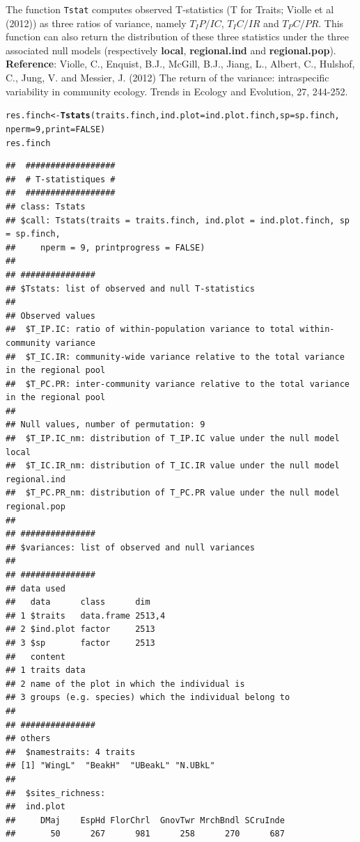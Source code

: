 \documentclass[12pt]{article}\usepackage[]{graphicx}\usepackage[]{color}
\makeatletter
\newcommand{\hlnum}[1]{\textcolor[rgb]{0.686,0.059,0.569}{#1}}%
\newcommand{\hlstd}[1]{\textcolor[rgb]{0.345,0.345,0.345}{#1}}%
\newcommand{\hlkwb}[1]{\textcolor[rgb]{0.69,0.353,0.396}{#1}}%
\newcommand{\hlkwc}[1]{\textcolor[rgb]{0.333,0.667,0.333}{#1}}%
\newcommand{\hlkwd}[1]{\textcolor[rgb]{0.737,0.353,0.396}{\textbf{#1}}}%
\newenvironment{kframe}{%
 \def\at@end@of@kframe{}%
 \ifinner\ifhmode%
  \def\at@end@of@kframe{\end{minipage}}%
  \begin{minipage}{\columnwidth}%
 \fi\fi%
 \def\FrameCommand##1{\hskip\@totalleftmargin \hskip-\fboxsep
 \colorbox{shadecolor}{##1}\hskip-\fboxsep
     \hskip-\linewidth \hskip-\@totalleftmargin \hskip\columnwidth}%
 \MakeFramed {\advance\hsize-\width
   \@totalleftmargin\z@ \linewidth\hsize
   \@setminipage}}%
 {\par\unskip\endMakeFramed%
 \at@end@of@kframe}
\newenvironment{knitrout}{}{} %
\makeatother
\begin{document}
The function \texttt{Tstat} computes observed T-statistics (T for Traits; Violle et al (2012)) as three ratios of variance, namely $T_IP/IC$, $T_IC/IR$ and $T_PC/PR$. This function can also return the distribution of these three statistics under the three associated null models (respectively \textbf{local}, \textbf{regional.ind} and \textbf{regional.pop}).
\\

\textbf{Reference}: Violle, C., Enquist, B.J., McGill, B.J., Jiang, L., Albert, C., Hulshof, C., Jung, V. and Messier, J. (2012) The return of the variance: intraspecific variability in community ecology. Trends in Ecology and Evolution, 27, 244-252.

\begin{knitrout}
\color{fgcolor}\begin{kframe}
\begin{alltt}
\hlstd{res.finch}\hlkwb{<-}\hlkwd{Tstats}\hlstd{(traits.finch,} \hlkwc{ind.plot} \hlstd{= ind.plot.finch,} \hlkwc{sp} \hlstd{= sp.finch,}
         \hlkwc{nperm} \hlstd{=} \hlnum{9}\hlstd{,} \hlkwc{print} \hlstd{=} \hlnum{FALSE}\hlstd{)}
\hlstd{res.finch}
\end{alltt}
\begin{verbatim}
## 	##################
## 	# T-statistiques #
## 	##################
## class: Tstats
## $call: Tstats(traits = traits.finch, ind.plot = ind.plot.finch, sp = sp.finch, 
##     nperm = 9, printprogress = FALSE)
## 
## ###############
## $Tstats: list of observed and null T-statistics
## 
## Observed values
## 	$T_IP.IC: ratio of within-population variance to total within-community variance
## 	$T_IC.IR: community-wide variance relative to the total variance in the regional pool
## 	$T_PC.PR: inter-community variance relative to the total variance in the regional pool
## 
## Null values, number of permutation: 9
## 	$T_IP.IC_nm: distribution of T_IP.IC value under the null model local
## 	$T_IC.IR_nm: distribution of T_IC.IR value under the null model regional.ind 
## 	$T_PC.PR_nm: distribution of T_PC.PR value under the null model regional.pop
## 
## ###############
## $variances: list of observed and null variances
## 
## ###############
## data used
##   data      class      dim   
## 1 $traits   data.frame 2513,4
## 2 $ind.plot factor     2513  
## 3 $sp       factor     2513  
##   content                                             
## 1 traits data                                         
## 2 name of the plot in which the individual is         
## 3 groups (e.g. species) which the individual belong to
## 
## ###############
## others
## 	$namestraits: 4 traits
## [1] "WingL"  "BeakH"  "UBeakL" "N.UBkL"
## 
## 	$sites_richness:
## 	ind.plot
##     DMaj    EspHd FlorChrl  GnovTwr MrchBndl SCruInde 
##       50      267      981      258      270      687
\end{verbatim}
\end{kframe}
\end{knitrout}
\end{document}
